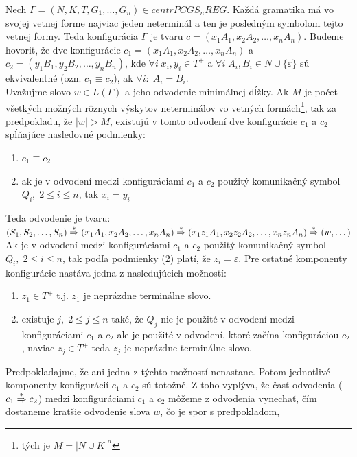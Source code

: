\begin{dokaz}
  Nech $\Gamma=(N,K,T,G_1,\dots ,G_n)\in centrPCGS_nREG$. Každá
  gramatika má vo svojej vetnej forme najviac jeden neterminál a ten
  je posledným symbolom tejto vetnej formy. Teda konfigurácia
  $\Gamma$ je tvaru $c=(x_1A_1,x_2A_2,\dots ,x_nA_n)$. Budeme
  hovoriť, že dve konfigurácie $c_1=(x_1A_1,x_2A_2,\dots ,x_nA_n)$ a
  $c_2=(y_1B_1,y_2B_2,\dots ,y_nB_n)$, kde $\forall i\; x_i,y_i\in
  T^+$ a $\forall i\; A_i,B_i\in N\cup\{\varepsilon\}$ sú
  ekvivalentné (ozn. $c_1\equiv c_2$), ak $\forall i :\; A_i=B_i$.
  \\ Uvažujme slovo $w\in L(\Gamma)$ a jeho odvodenie minimálnej
  dĺžky. Ak $M$ je počet všetkých možných rôznych výskytov
  neterminálov vo vetných formách\footnote{tých je $M=|N\cup K|^n$},
  tak za predpokladu, že $|w|>M$, existujú v tomto odvodení dve
  konfigurácie $c_1$ a $c_2$ spĺňajúce nasledovné podmienky:
  \begin{enumerate}
    \item $c_1\equiv c_2$
    \item ak je v odvodení medzi konfiguráciami $c_1$ a $c_2$ použitý
    komunikačný symbol $Q_i,\; 2\leq i\leq n$, tak $x_i=y_i$
  \end{enumerate}
  Teda odvodenie je tvaru: \\ $(S_1,S_2,\dots ,S_n)\overset{*}{\Rightarrow}
  (x_1A_1,x_2A_2,\dots ,x_nA_n)\overset{*}{\Rightarrow}
  (x_1z_1A_1,x_2z_2A_2,\dots ,x_nz_nA_n)\overset{*}{\Rightarrow} (w,\dots)$ \\
  Ak je v odvodení medzi konfiguráciami $c_1$ a $c_2$ použitý
  komunikačný symbol $Q_i,\; 2\leq i\leq n$, tak podľa podmienky (2)
  platí, že $z_i=\varepsilon$. Pre ostatné komponenty konfigurácie
  nastáva jedna z nasledujúcich možností:
  \begin{enumerate}
    \item $z_1\in T^+$ t.j. $z_1$ je neprázdne terminálne slovo.
    \item existuje $j,\; 2\leq j\leq n$ také, že $Q_j$ nie je použité v odvodení medzi
    konfiguráciami $c_1$ a $c_2$ ale je použité v odvodení, ktoré
    začína konfiguráciou $c_2$, naviac $z_j\in T^+$ teda $z_j$ je
    neprázdne terminálne slovo.
  \end{enumerate}
  Predpokladajme, že ani jedna z týchto možností nenastane. Potom
  jednotlivé komponenty konfigurácií $c_1$ a $c_2$ sú totožné. Z
  toho vyplýva, že časť odvodenia ($c_1\overset{*}{\Rightarrow} c_2$) medzi
  konfiguráciami $c_1$ a $c_2$ môžeme z odvodenia vynechať, čím
  dostaneme kratšie odvodenie slova $w$, čo je spor s predpokladom,

\end{dokaz}
